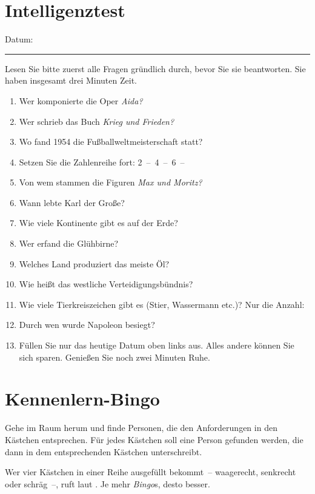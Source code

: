 \chapter{Intelligenztest}
\label{iq}
\medskip
Datum: \rule{3cm}{0,4pt}
\bigskip

Lesen Sie bitte zuerst alle Fragen gründlich durch, bevor Sie sie beantworten. Sie haben insgesamt drei Minuten Zeit.

\begin{enumerate}
\item Wer komponierte die Oper \emph{Aida?} \hrulefill
\item Wer schrieb das Buch \emph{Krieg und Frieden?} \hrulefill
\item Wo fand 1954 die Fußballweltmeisterschaft statt? \hrulefill
\item Setzen Sie die Zahlenreihe fort: 2~--~4~--~6~-- \hrulefill
\item Von wem stammen die Figuren \emph{Max und Moritz?} \hrulefill
\item Wann lebte Karl der Große? \hrulefill
\item Wie viele Kontinente gibt es auf der Erde? \hrulefill
\item Wer erfand die Glühbirne? \hrulefill
\item Welches Land produziert das meiste Öl? \hrulefill
\item Wie heißt das westliche Verteidigungsbündnis? \hrulefill
\item Wie viele Tierkreiszeichen gibt es (Stier, Wassermann etc.)? Nur die Anzahl: \hrulefill
\item Durch wen wurde Napoleon besiegt? \hrulefill
\item Füllen Sie nur das heutige Datum oben links aus. Alles andere können Sie sich sparen. Genießen Sie noch zwei Minuten Ruhe.
\end{enumerate}

\chapter{Kennenlern-Bingo}
\label{bingo}
Gehe im Raum herum und finde Personen, die den Anforderungen in den Kästchen entsprechen. Für jedes Kästchen soll eine Person gefunden werden, die dann in dem entsprechenden Kästchen unterschreibt.

Wer vier Kästchen in einer Reihe ausgefüllt bekommt~-- waagerecht, senkrecht oder schräg~--, ruft laut . Je mehr \emph{Bingo}s, desto besser.

